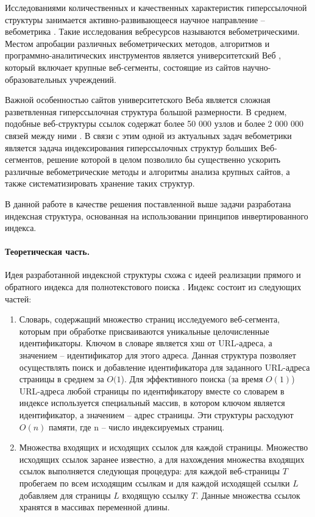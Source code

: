 Исследованиями количественных и качественных характеристик гиперссылочной структуры занимается активно-развивающееся научное направление -- вебометрика \cite{Pechnikov,PechnikovNwohiri}. Такие исследования вебресурсов называются вебометрическими. Местом апробации различных вебометрических методов, алгоритмов и программно-аналитических инструментов является университетский Веб \cite{Pechnikov,MaksimovBlekanov,BlekanovSergeevMaksimovBOWTIE}, который включает крупные веб-сегменты, состоящие из сайтов научно-образовательных учреждений.

Важной особенностью сайтов университетского Веба является сложная разветвленная гиперссылочная структура большой размерности. В среднем, подобные веб-структуры ссылок содержат более 50 000 узлов и более 2 000 000 связей между ними \cite{Pechnikov,BlekanovSergeevMaksimov}. В связи с этим одной из актуальных задач вебометрики является задача индексирования гиперссылочных структур больших Веб-сегментов, решение которой в целом позволило бы существенно ускорить различные вебометрические методы и алгоритмы анализа крупных сайтов, а также систематизировать хранение таких структур.

В данной работе в качестве решения поставленной выше задачи разработана индексная структура, основанная на использовании принципов инвертированного индекса.

\paragraph{Теоретическая часть.} Идея разработанной индексной структуры схожа с идеей реализации прямого и обратного индекса для полнотекстового поиска \cite{ManningRaghavanSchutze}. Индекс состоит из следующих частей:

\begin{enumerate}
	\item Словарь, содержащий множество страниц исследуемого веб-сегмента, которым при обработке присваиваются уникальные целочисленные идентификаторы. Ключом в словаре является хэш от URL-адреса, а значением -- идентификатор для этого адреса. Данная структура позволяет осуществлять поиск и добавление идентификатора для заданного URL-адреса страницы в среднем за \(O(1\)). Для эффективного поиска (за время \(O(1)\)) URL-адреса любой страницы по идентификатору вместе со словарем в индексе используется специальный массив, в котором ключом является идентификатор, а значением -- адрес страницы. Эти структуры расходуют \(O(n)\) памяти, где n -- число индексируемых страниц.
	\item Множества входящих и исходящих ссылок для каждой страницы. Множество исходящих ссылок заранее известно, а для нахождения множества входящих ссылок выполняется следующая процедура: для каждой веб-страницы \(T\) пробегаем по всем исходящим ссылкам и для каждой исходящей ссылки \(L\) добавляем для страницы \(L\) входящую ссылку \(T\). Данные множества ссылок хранятся в массивах переменной длины.
\end{enumerate}

